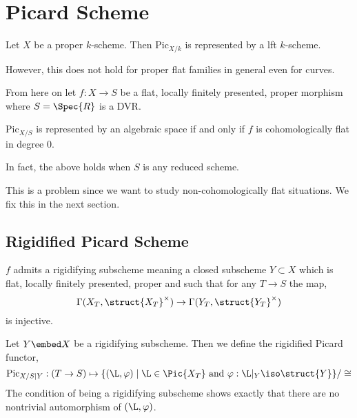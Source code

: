 \documentclass[12pt]{article}
\newcommand{\fPic}{\mathrm{Pic}}
\begin{document}
\section{Picard Scheme}

\begin{theorem}
Let $X$ be a proper $k$-scheme. Then $\fPic_{X/k}$ is represented by a lft $k$-scheme. 
\end{theorem}

\begin{rmk}
However, this does not hold for proper flat families in general even for curves. 
\end{rmk}

From here on let $f : X \to S$ be a flat, locally finitely presented, proper morphism where $S = \Spec{R}$ is a DVR. 

\begin{theorem}[8.3.2]
$\fPic_{X/S}$ is represented by an algebraic space if and only if $f$ is cohomologically flat in degree $0$.
\end{theorem}

\begin{rmk}
In fact, the above holds when $S$ is any reduced scheme.
\end{rmk}

This is a problem since we want to study non-cohomologically flat situations. We fix this in the next section.

\subsection{Rigidified Picard Scheme}

\begin{prop}[8.1.6]
$f$ admits a rigidifying subscheme meaning a closed subscheme $Y \subset X$ which is flat, locally finitely presented, proper and such that for any $T \to S$ the map,
\[ \Gamma(X_T, \struct{X_T}^\times) \to \Gamma(Y_T, \struct{Y_T}^\times) \]
is injective.  
\end{prop}


\begin{defn}
Let $Y \embed X$ be a rigidifying subscheme. Then we define the rigidified Picard  functor,
\[ \fPic_{X/S|Y} : (T \to S) \mapsto \{ (\L, \varphi) \mid \L \in \Pic{X_T} \text{ and } \varphi : \L|_Y \iso \struct{Y} \} / \cong \]
The condition of being a rigidifying subscheme shows exactly that there are no nontrivial automorphism of $(\L, \varphi)$. 
\end{defn}
\end{document}
